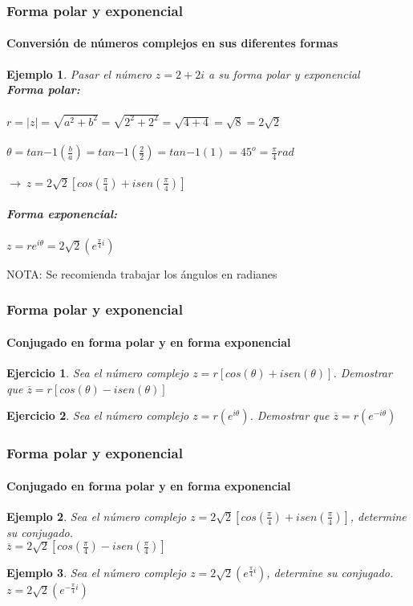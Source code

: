 \documentclass[11pt]{beamer}
\newtheorem{eje}{Ejercicio}
\newtheorem{ejem}{Ejemplo}
\begin{document}
\begin{frame}
\frametitle{Forma polar y exponencial}
\framesubtitle{ Conversión de números complejos en sus diferentes formas}
\begin{ejem}
Pasar el número $z = 2+2i$ a su forma polar y exponencial\\
\textbf{Forma polar:}\\ \hspace{0cm} \\
$r = |z| = \sqrt{a^2 + b^2} = \sqrt{2^2 + 2^2} = \sqrt{4 + 4} = \sqrt{8} = 2\sqrt{2}$\\ \hspace{0cm} \\
$\theta = tan{-1}(\frac{b}{a}) = tan{-1}(\frac{2}{2}) = tan{-1}(1) =  45^o = \frac{\pi}{4}rad$\\ \hspace{0cm} \\
$\rightarrow~z = 2\sqrt{2}[cos(\frac{\pi}{4}) + isen(\frac{\pi}{4})]$\\ \hspace{0cm} \\
\textbf{Forma exponencial:}\\ \hspace{0cm} \\
$z = re^{i\theta} = 2\sqrt{2}(e^{\frac{\pi}{4}i})$\\
\end{ejem}
NOTA: Se recomienda trabajar los ángulos en radianes
\end{frame}

\begin{frame}
\frametitle{Forma polar y exponencial}
\framesubtitle{Conjugado en forma polar y en forma exponencial}
\begin{eje}
Sea el número complejo $z = r[cos(\theta)+isen(\theta)]$. Demostrar que $\overline{z} = r[cos(\theta)-isen(\theta)]$
\end{eje}
\begin{eje}
Sea el número complejo $z = r(e^{i\theta})$. Demostrar que $\overline{z} = r(e^{-i\theta})$
\end{eje}
\end{frame}

\begin{frame}
\frametitle{Forma polar y exponencial}
\framesubtitle{Conjugado en forma polar y en forma exponencial}
\begin{ejem}
Sea el número complejo $z = 2\sqrt{2}[cos(\frac{\pi}{4})+isen(\frac{\pi}{4})]$, determine su conjugado.\\
$\overline{z} = 2\sqrt{2}[cos(\frac{\pi}{4})-isen(\frac{\pi}{4})]$
\end{ejem}
\begin{ejem}
Sea el número complejo $z = 2\sqrt{2}(e^{\frac{\pi}{4}i})$, determine su conjugado.\\
$z = 2\sqrt{2}(e^{-\frac{\pi}{4}i})$
\end{ejem}
\end{frame}
\end{document}
